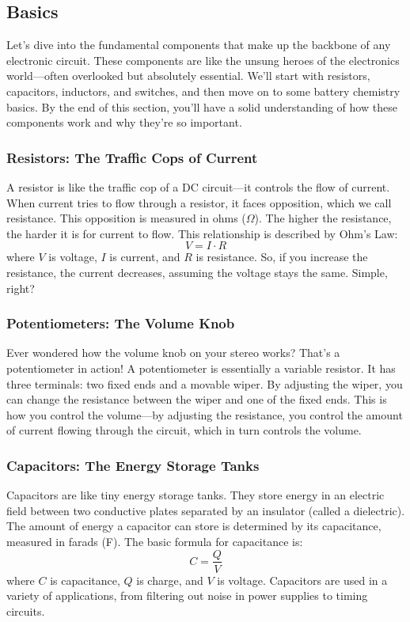 \subsection{Basics}
\label{subsec:basics-passive}

Let's dive into the fundamental components that make up the backbone of any electronic circuit. These components are like the unsung heroes of the electronics world—often overlooked but absolutely essential. We'll start with resistors, capacitors, inductors, and switches, and then move on to some battery chemistry basics. By the end of this section, you'll have a solid understanding of how these components work and why they're so important.

\subsubsection*{Resistors: The Traffic Cops of Current}
A resistor is like the traffic cop of a DC circuit—it controls the flow of current. When current tries to flow through a resistor, it faces opposition, which we call resistance. This opposition is measured in ohms ($\Omega$). The higher the resistance, the harder it is for current to flow. This relationship is described by Ohm's Law:
\begin{equation}
    V = I \cdot R
\end{equation}
where $V$ is voltage, $I$ is current, and $R$ is resistance. So, if you increase the resistance, the current decreases, assuming the voltage stays the same. Simple, right?

\subsubsection*{Potentiometers: The Volume Knob}
Ever wondered how the volume knob on your stereo works? That's a potentiometer in action! A potentiometer is essentially a variable resistor. It has three terminals: two fixed ends and a movable wiper. By adjusting the wiper, you can change the resistance between the wiper and one of the fixed ends. This is how you control the volume—by adjusting the resistance, you control the amount of current flowing through the circuit, which in turn controls the volume.

\subsubsection*{Capacitors: The Energy Storage Tanks}
Capacitors are like tiny energy storage tanks. They store energy in an electric field between two conductive plates separated by an insulator (called a dielectric). The amount of energy a capacitor can store is determined by its capacitance, measured in farads (F). The basic formula for capacitance is:
\begin{equation}
    C = \frac{Q}{V}
\end{equation}
where $C$ is capacitance, $Q$ is charge, and $V$ is voltage. Capacitors are used in a variety of applications, from filtering out noise in power supplies to timing circuits.

